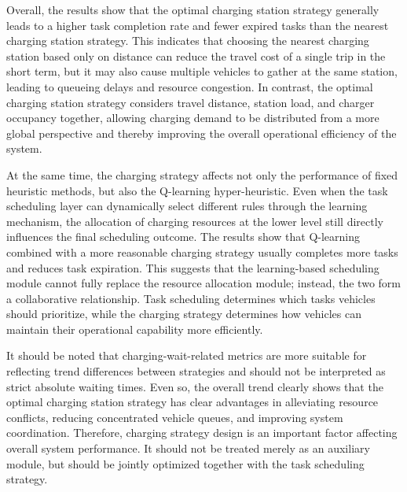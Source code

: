 Overall, the results show that the optimal charging station strategy generally leads to a higher task completion rate and fewer expired tasks than the nearest charging station strategy. This indicates that choosing the nearest charging station based only on distance can reduce the travel cost of a single trip in the short term, but it may also cause multiple vehicles to gather at the same station, leading to queueing delays and resource congestion. In contrast, the optimal charging station strategy considers travel distance, station load, and charger occupancy together, allowing charging demand to be distributed from a more global perspective and thereby improving the overall operational efficiency of the system.

At the same time, the charging strategy affects not only the performance of fixed heuristic methods, but also the Q-learning hyper-heuristic. Even when the task scheduling layer can dynamically select different rules through the learning mechanism, the allocation of charging resources at the lower level still directly influences the final scheduling outcome. The results show that Q-learning combined with a more reasonable charging strategy usually completes more tasks and reduces task expiration. This suggests that the learning-based scheduling module cannot fully replace the resource allocation module; instead, the two form a collaborative relationship. Task scheduling determines which tasks vehicles should prioritize, while the charging strategy determines how vehicles can maintain their operational capability more efficiently.

It should be noted that charging-wait-related metrics are more suitable for reflecting trend differences between strategies and should not be interpreted as strict absolute waiting times. Even so, the overall trend clearly shows that the optimal charging station strategy has clear advantages in alleviating resource conflicts, reducing concentrated vehicle queues, and improving system coordination. Therefore, charging strategy design is an important factor affecting overall system performance. It should not be treated merely as an auxiliary module, but should be jointly optimized together with the task scheduling strategy.
